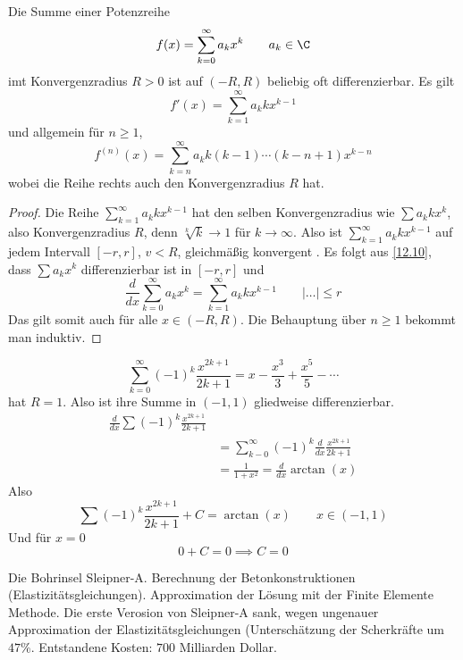 \documentclass{mycourse}
\begin{document}
\begin{thm}
\label{12.10}
Die Summe einer Potenzreihe
\[
f(x)=\sum_{k=0}^\infty a_kx^k \qquad a_k\in\C
\]
imt Konvergenzradius $R>0$ ist auf $(-R,R)$ beliebig oft differenzierbar.
Es gilt
\[
f'(x)=\sum_{k=1}^\infty a_kkx^{k-1}
\]
und allgemein für $n\ge 1$,
\[
f^{(n)}(x)=\sum_{k=n}^\infty a_k k(k-1)\dotsb (k-n+1)x^{k-n}
\]
wobei die Reihe rechts auch den Konvergenzradius $R$ hat.
\begin{proof}
Die Reihe $\sum_{k=1}^\infty a_kkx^{k-1}$ hat den selben Konvergenzradius wie $\sum a_kkx^k$, also Konvergenzradius $R$, denn $\sqrt[k]{k}\to 1$ für $k\to\infty$.
Also ist $\sum_{k=1}^\infty a_kkx^{k-1}$ auf jedem Intervall $[-r,r]$, $v<R$, gleichmäßig konvergent
.
Es folgt aus \ref{12.10}, dass $\sum a_kx^k$ differenzierbar ist in $[-r,r]$ und
\[
\frac d{dx}\sum_{k=0}^\infty a_kx^k=\sum_{k=1}^\infty a_k k x^{k-1} \qquad |\dotsc|\le r
\]
Das gilt somit auch für alle $x\in (-R,R)$.
Die Behauptung über $n\ge 1$ bekommt man induktiv.
\end{proof}
\begin{ex*}
\[
\sum_{k=0}^\infty (-1)^k\frac{x^{2k+1}}{2k+1}=x-\frac{x^3}3 +\frac{x^5}5-\dotsb
\]
hat $R=1$. Also ist ihre Summe in $(-1,1)$ gliedweise differenzierbar.
\begin{align*}
\frac d{dx} \sum (-1)^k \frac{x^{2k+1}}{2k+1} \\
&= \sum_{k-0}^\infty (-1)^k\frac d{dx} \frac {x^{2k+1}}{2k+1}\\
&= \frac 1{1+x^2} = \frac d{dx} \arctan(x)
\end{align*}
Also
\[
\sum (-1)^k\frac{x^{2k+1}}{2k+1}+C=\arctan(x) \qquad x\in (-1,1)
\]
Und für $x=0$
\[
0+C = 0 \implies C=0
\]
\end{ex*}
\end{thm}

\begin{note}
Die Bohrinsel Sleipner-A.
Berechnung der Betonkonstruktionen (Elastizitätsgleichungen).
Approximation der Lösung mit der Finite Elemente Methode.
Die erste Verosion von Sleipner-A sank, wegen ungenauer Approximation der Elastizitätsgleichungen (Unterschätzung der Scherkräfte um $47\%$.
Entstandene Kosten: $700$ Milliarden Dollar.
\end{note}
\begin{note}
\end{note}
\end{document}
